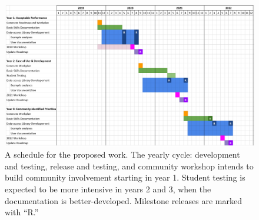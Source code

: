 \begin{figure}[htb]
    \begin{center}
      \includegraphics[width=\textwidth]{Figures/schedule2}
    \end{center}
    \caption{A schedule for the proposed work.  The yearly cycle: development and testing,  release and testing, and community workshop intends to build community involvement starting in year 1. Student testing is expected to be more intensive in years 2 and 3, when the documentation is better-developed.  Milestone releases are marked with ``R.''}
    \label{fig:ops-schedule}
\end{figure}